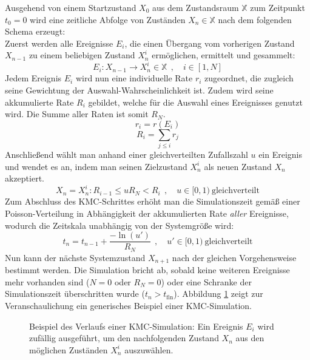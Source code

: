 Ausgehend von einem Startzustand $X_0$ aus dem Zustandsraum $\mathbb{X}$ zum Zeitpunkt $t_0 = 0$ wird eine zeitliche Abfolge von Zuständen $X_n \in \mathbb{X}$ nach dem folgenden Schema erzeugt:\\
Zuerst werden alle Ereignisse $E_i$, die einen Übergang vom vorherigen Zustand $X_{n-1}$ zu einem beliebigen Zustand $X_n^i$ ermöglichen, ermittelt und gesammelt:
\begin{equation}
  E_i : X_{n-1} \rightarrow X_n^i \in \mathbb{X} ~~,\quad i \in [1, N]
\end{equation}
Jedem Ereignis $E_i$ wird nun eine individuelle Rate $r_i$ zugeordnet, die zugleich seine Gewichtung der Auswahl-Wahrscheinlichkeit ist.
Zudem wird seine akkumulierte Rate $R_i$ gebildet, welche für die Auswahl eines Ereignisses genutzt wird.
Die Summe aller Raten ist somit $R_N$.
\begin{equation}
  r_i = r(E_i)
\end{equation}
\begin{equation}
  R_i = \sum_{j \le i}{r_j}
\end{equation}
Anschließend wählt man anhand einer gleichverteilten Zufallszahl $u$ ein Ereignis und wendet es an, indem man seinen Zielzustand $X_n^i$ als neuen Zustand $X_n$ akzeptiert.
\begin{equation}
  X_n = X_n^i : R_{i-1} \le u R_N < R_i ~~,\quad u \in [0,1)~\text{gleichverteilt}
\end{equation}
Zum Abschluss des KMC-Schrittes erhöht man die Simulationszeit gemäß einer Poisson-Verteilung in Abhängigkeit der akkumulierten Rate \textit{aller} Ereignisse, wodurch die Zeitskala unabhängig von der Systemgröße wird:
\begin{equation}
  t_n = t_{n-1} + \frac{-\ln(u')}{R_N} ~~,\quad u' \in [0,1)~\text{gleichverteilt}
\end{equation}
Nun kann der nächste Systemzustand $X_{n+1}$ nach der gleichen Vorgehensweise bestimmt werden.
Die Simulation bricht ab, sobald keine weiteren Ereignisse mehr vorhanden sind ($N=0$ oder $R_N=0$) oder eine Schranke der Simulationszeit überschritten wurde ($t_n > t_\text{fin}$).
Abbildung \ref{fig:kmctree} zeigt zur Veranschaulichung ein generisches Beispiel einer KMC-Simulation.

\begin{figure}
  \centering  

  \def\svgwidth{14cm}
  

  \caption[KMC-Baum]{Beispiel des Verlaufs einer KMC-Simulation:
    Ein Ereignis $E_i$ wird zufällig ausgeführt, um den nachfolgenden Zustand $X_n$ aus den möglichen Zuständen $X_n^i$ auszuwählen.
  }
  \label{fig:kmctree}
\end{figure}

